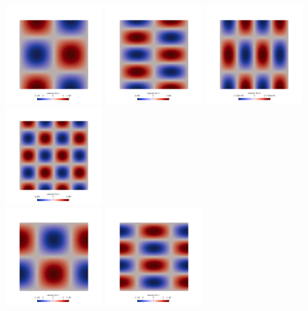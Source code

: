 \newpage
\begin{center}
\includegraphics[width=3.74cm]{python_codes/fieldstone_32/results/u_1x1}
\includegraphics[width=3.74cm]{python_codes/fieldstone_32/results/u_1x2}
\includegraphics[width=3.74cm]{python_codes/fieldstone_32/results/u_2x1}
\includegraphics[width=3.74cm]{python_codes/fieldstone_32/results/u_2x2}\\
\includegraphics[width=3.74cm]{python_codes/fieldstone_32/results/v_1x1}
\includegraphics[width=3.74cm]{python_codes/fieldstone_32/results/v_1x2}

\end{center}
